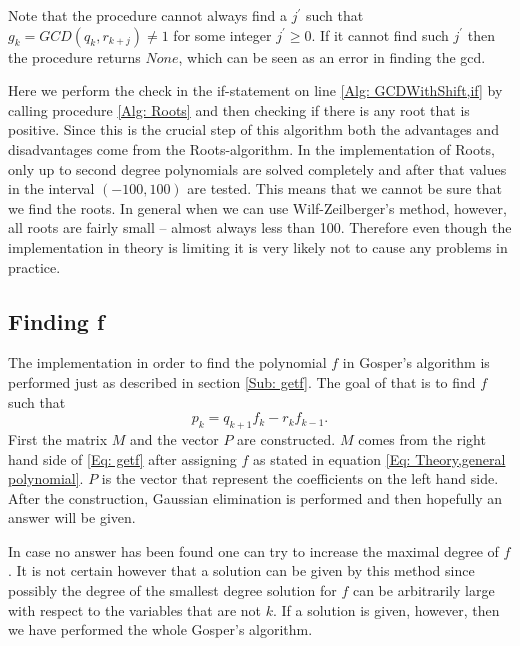 \begin{remark}
  Note that the procedure cannot always find a $j^\prime$ such that $g_k=GCD(q_k,r_{k+j})\neq 1$ for some integer $j^\prime\geq 0$. If it cannot find such $j^\prime$ then the procedure returns $None$, which can be seen as an error in finding the gcd.
\end{remark}
Here we perform the check in the if-statement on line \ref{Alg: GCDWithShift,if} by calling procedure \ref{Alg: Roots} and then checking if there is any root that is positive. Since this is the crucial step of this algorithm both the advantages and disadvantages come from the Roots-algorithm. In the implementation of Roots, only up to second degree polynomials are solved completely and after that values in the interval $(-100,100)$ are tested. This means that we cannot be sure that we find the roots. In general when we can use Wilf-Zeilberger's method, however, all roots are fairly small -- almost always less than 100. Therefore even though the implementation in theory is limiting it is very likely not to cause any problems in practice.
\subsection{Finding f}
The implementation in order to find the polynomial $f$ in Gosper's algorithm is performed just as described in section \ref{Sub: getf}. The goal of that is to find $f$ such that
\begin{equation}\label{Eq: getf}
  p_k=q_{k+1}f_k-r_kf_{k-1}.
\end{equation}
First the matrix $M$ and the vector $P$ are constructed. $M$ comes from the right hand side of \ref{Eq: getf} after assigning $f$ as stated in equation \ref{Eq: Theory,general polynomial}. $P$ is the vector that represent the coefficients on the left hand side. After the construction, Gaussian elimination is performed and then hopefully an answer will be given.

In case no answer has been found one can try to increase the maximal degree of $f$. It is not certain however that a solution can be given by this method since possibly the degree of the smallest degree solution for $f$ can be arbitrarily large with respect to the variables that are not $k$. If a solution is given, however, then we have performed the whole Gosper's algorithm.

